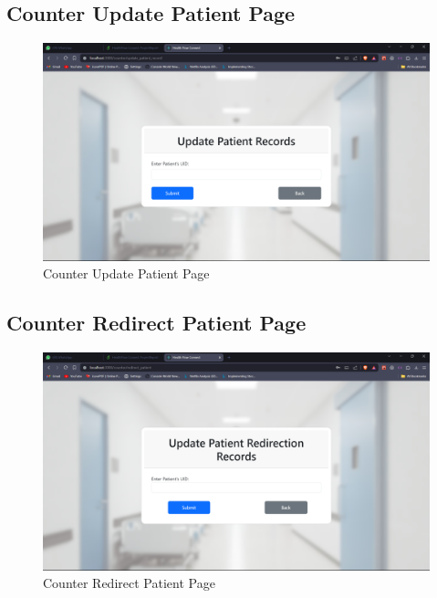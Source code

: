 \subsection{Counter Update Patient Page}
\begin{figure}[h!]
    \centering
    \includegraphics[width=\textwidth]{Counter_Update_Patient.png}
    \caption{Counter Update Patient Page}
\end{figure}
\subsection{Counter Redirect Patient Page}
\begin{figure}[h!]
    \centering
    \includegraphics[width=\textwidth]{Counter_Redirect_Patient.png}
    \caption{Counter Redirect Patient Page}
\end{figure}

\clearpage
